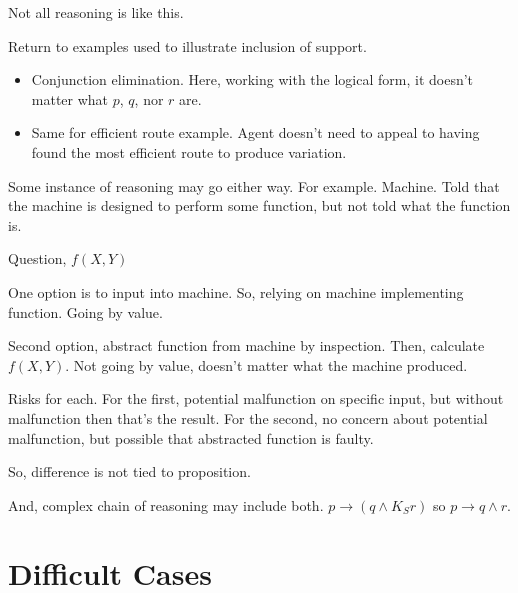 \begin{note}
  Not all reasoning is like this.

  Return to examples used to illustrate inclusion of support.
  \begin{itemize}
  \item Conjunction elimination.
    Here, working with the logical form, it doesn't matter what \(p\), \(q\), nor \(r\) are.
  \item Same for efficient route example.
    Agent doesn't need to appeal to having found the most efficient route to produce variation.
  \end{itemize}

  Some instance of reasoning may go either way.
  For example.
  Machine.
  Told that the machine is designed to perform some function, but not told what the function is.

  Question, \(f(X,Y)\)

  One option is to input into machine.
  So, relying on machine implementing function.
  Going by value.

  Second option, abstract function from machine by inspection.
  Then, calculate \(f(X,Y)\).
  Not going by value, doesn't matter what the machine produced.

  Risks for each.
  For the first, potential malfunction on specific input, but without malfunction then that's the result.
  For the second, no concern about potential malfunction, but possible that abstracted function is faulty.

  So, difference is not tied to proposition.

  And, complex chain of reasoning may include both.
  \(p \rightarrow (q \land K_{S}r)\) so \(p \rightarrow q \land r\).
\end{note}


\section{Difficult Cases}
\label{sec:difficult-cases}


